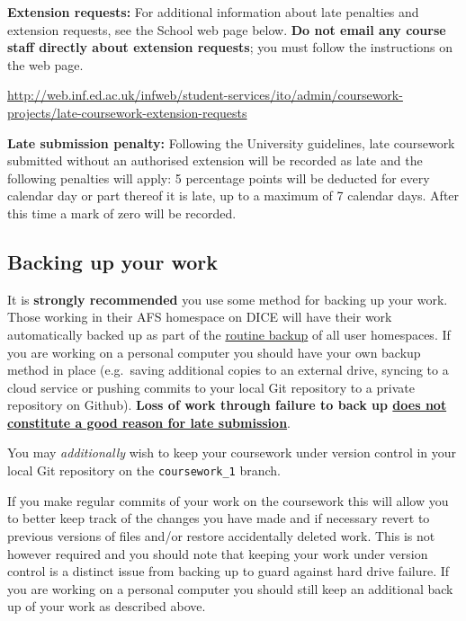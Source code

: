 \documentclass[11pt,]{article}
\begin{document}
\textbf{Extension requests:} 
For additional information about late penalties and extension
requests, see the School web page below. \textbf{Do  not email any course
staff directly about extension requests}; you must follow the
instructions on the web page.

{\small \url{http://web.inf.ed.ac.uk/infweb/student-services/ito/admin/coursework-projects/late-coursework-extension-requests}}

\textbf{Late submission penalty:}  
Following the University guidelines, 
late coursework submitted without an authorised extension will be
recorded as late and the following penalties will apply: 5
percentage points will be deducted for every calendar day or part
thereof it is late, up to a maximum of 7 calendar days. After this
time a mark of zero will be recorded.

\subsection{Backing up your work}
\label{sec:backing-up-your-work}

It is \textbf{strongly recommended} you use some method for backing up
your work. Those working in their AFS homespace on DICE will have their
work automatically backed up as part of the
\href{http://computing.help.inf.ed.ac.uk/backups-and-mirrors}{routine
backup} of all user homespaces. If you are working on a personal
computer you should have your own backup method in place (e.g.~saving
additional copies to an external drive, syncing to a cloud service or
pushing commits to your local Git repository to a private repository on
Github). \textbf{Loss of work through failure to back up
\href{http://web.inf.ed.ac.uk/infweb/student-services/ito/admin/coursework-projects/late-coursework-extension-requests}{does not constitute a good reason for
late submission}}.

You may \emph{additionally} wish to keep your coursework under version
control in your local Git repository on the \verb+coursework_1+ branch.

If you make regular commits of your work on the coursework this will
allow you to better keep track of the changes you have made and if
necessary revert to previous versions of files and/or restore
accidentally deleted work. This is not however required and you should
note that keeping your work under version control is a distinct issue
from backing up to guard against hard drive failure. If you are working
on a personal computer you should still keep an additional back up of
your work as described above.
\end{document}
